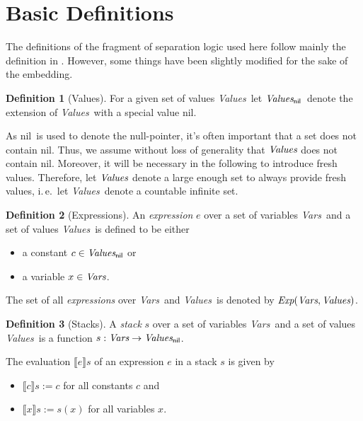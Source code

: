 \documentclass{scrartcl}
\theoremstyle{definition}
\newtheorem{definition}{Definition}
\newcommand{\nil}{{\textsf{nil}}}
\newcommand{\values}{{\emph{Values}}}
\newcommand{\valuesnil}{\ensuremath{\values_\nil}}
\newcommand{\vars}{{\emph{Vars}}}
\newcommand{\expr}{{\emph{Exp}}}
\begin{document}
\section{Basic Definitions}

The definitions of the fragment of separation logic used here follow mainly the definition in
\cite{berdine05symbolic}. However, some things have been slightly modified for the
sake of the embedding.

\begin{definition}[Values]
  For a given set of values \values\ let \valuesnil\ 
  denote the extension of \values\ with a special value \nil.

  As \nil\ is used to denote the null-pointer, it's often important that a set
  does not contain \nil. Thus, we assume without loss of generality that
  $\values$ does not contain \nil. Moreover, it will be necessary in the
  following to introduce fresh values. Therefore, let $\values$ denote a large
  enough set to always provide fresh values, i.\,e.\ let \values\ denote a
  countable infinite set.
\end{definition}

\begin{definition}[Expressions]
  An \emph{expression} $e$ over a set of variables \vars\ and a set of values
  \values\ is defined to be either
\begin{itemize}
\item a constant $c \in \valuesnil$ or
\item a variable $x \in \vars$.
\end{itemize}
%
The set of all \emph{expressions} over \vars\ and \values\ is denoted by
$\expr(\vars,\values)$.
\end{definition}


\begin{definition}[Stacks]
  A \emph{stack} $s$ over a set of variables \vars\ and a set of values
  \values\ is a function $s: \vars \to \valuesnil$.

  The evaluation $\llbracket e \rrbracket s$ of an expression $e$ in a stack
  $s$ is given by
 \begin{itemize}
\item $\llbracket c \rrbracket s := c$ for all constants $c$ and
\item $\llbracket x \rrbracket s := s(x)$ for all variables $x$.
\end{itemize}
\end{definition}
\end{document}
